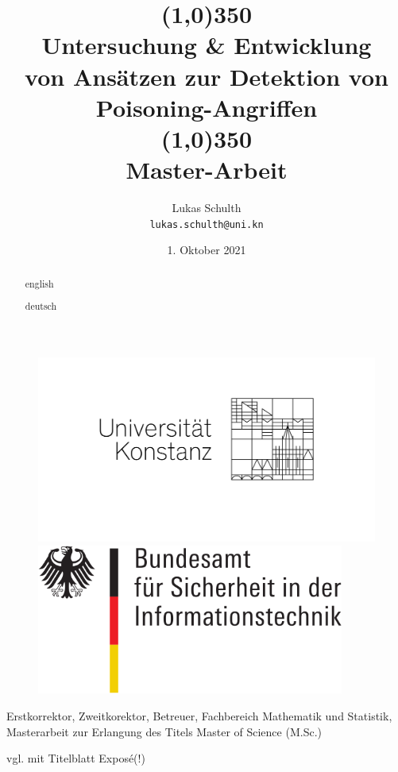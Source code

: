 \documentclass[twoside, 11pt,a4paper]{article}
\title{\line(1,0){350}\\Untersuchung \& Entwicklung \\von Ansätzen zur Detektion von Poisoning-Angriffen\\\line(1,0){350}\\
	Master-Arbeit}
\author{
	Lukas Schulth\\
	\texttt{lukas.schulth@uni.kn}
}
\date{1. Oktober 2021}
\numberwithin{equation}{section}
\begin{document}
	\begin{titlepage}
		
		
		
		\thispagestyle{empty} 
		\begin{figure}
			\centering
			\begin{minipage}{0.45\textwidth}
				\centering
				\includegraphics[width=1.2\textwidth]{logounikn} %
				
			\end{minipage}\hfill
			\begin{minipage}{0.45\textwidth}
				\centering
				\includegraphics[width=0.9\textwidth]{bsi_logo} %
			
			\end{minipage}
		\end{figure}
	\maketitle
	
	Erstkorrektor, Zweitkorektor, Betreuer, Fachbereich Mathematik und Statistik, Masterarbeit zur Erlangung des Titels Master of Science (M.Sc.)
	
	vgl. mit Titelblatt Exposé(!)
	
	\end{titlepage}
	\begin{abstract}english\end{abstract}
	\begin{abstract}deutsch\end{abstract}
\end{document}
